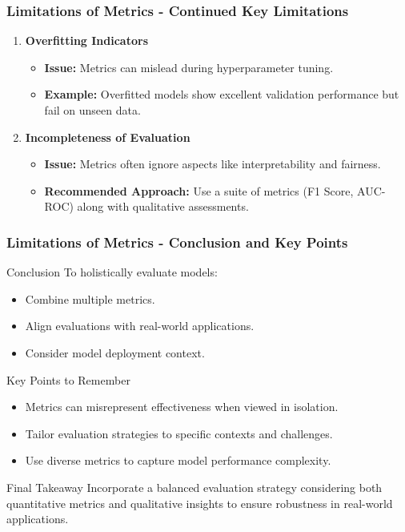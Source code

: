 \documentclass{beamer}
\begin{document}
\begin{frame}[fragile]
    \frametitle{Limitations of Metrics - Continued Key Limitations}
    \begin{enumerate}[resume]
        \item \textbf{Overfitting Indicators}
        \begin{itemize}
            \item \textbf{Issue:} Metrics can mislead during hyperparameter tuning.
            \item \textbf{Example:} Overfitted models show excellent validation performance but fail on unseen data.
        \end{itemize}

        \item \textbf{Incompleteness of Evaluation}
        \begin{itemize}
            \item \textbf{Issue:} Metrics often ignore aspects like interpretability and fairness.
            \item \textbf{Recommended Approach:} Use a suite of metrics (F1 Score, AUC-ROC) along with qualitative assessments.
        \end{itemize}
    \end{enumerate}
\end{frame}

\begin{frame}[fragile]
    \frametitle{Limitations of Metrics - Conclusion and Key Points}
    \begin{block}{Conclusion}
        To holistically evaluate models:
        \begin{itemize}
            \item Combine multiple metrics.
            \item Align evaluations with real-world applications.
            \item Consider model deployment context.
        \end{itemize}
    \end{block}

    \begin{block}{Key Points to Remember}
        \begin{itemize}
            \item Metrics can misrepresent effectiveness when viewed in isolation.
            \item Tailor evaluation strategies to specific contexts and challenges.
            \item Use diverse metrics to capture model performance complexity.
        \end{itemize}
    \end{block}
    
    \begin{block}{Final Takeaway}
        Incorporate a balanced evaluation strategy considering both quantitative metrics and qualitative insights to ensure robustness in real-world applications.
    \end{block}
\end{frame}
\end{document}
